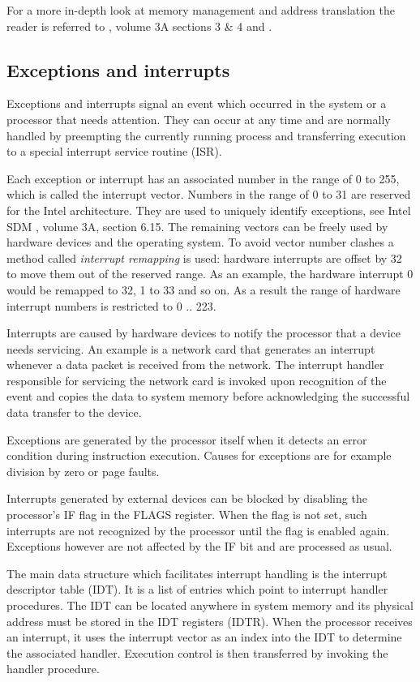 For a more in-depth look at memory management and address translation the reader
is referred to \cite{IntelSDM}, volume 3A sections 3 \& 4 and
\cite{Drepper07whatevery}.

\subsection{Exceptions and interrupts}\label{subsec:exceptions-interrupts}
Exceptions and interrupts signal an event which occurred in the system or a
processor that needs attention. They can occur at any time and are normally
handled by preempting the currently running process and transferring execution
to a special interrupt service routine (ISR).

Each exception or interrupt has an associated number in the range of 0 to 255,
which is called the interrupt vector. Numbers in the range of 0 to 31 are
reserved for the Intel architecture. They are used to uniquely identify
exceptions, see Intel SDM \cite{IntelSDM}, volume 3A, section 6.15.  The
remaining vectors can be freely used by hardware devices and the operating
system. To avoid vector number clashes a method called
\emph{interrupt remapping} is used: hardware interrupts are offset by 32 to move
them out of the reserved range. As an example, the hardware interrupt 0 would be
remapped to 32, 1 to 33 and so on. As a result the range of hardware interrupt
numbers is restricted to 0 .. 223.

Interrupts are caused by hardware devices to notify the processor that a device
needs servicing. An example is a network card that generates an interrupt
whenever a data packet is received from the network. The interrupt handler
responsible for servicing the network card is invoked upon recognition of the
event and copies the data to system memory before acknowledging the successful
data transfer to the device.

Exceptions are generated by the processor itself when it detects an error
condition during instruction execution. Causes for exceptions are for example
division by zero or page faults.

Interrupts generated by external devices can be blocked by disabling the
processor's IF flag in the FLAGS register. When the flag is not set, such
interrupts are not recognized by the processor until the flag is enabled again.
Exceptions however are not affected by the IF bit and are processed as usual.

The main data structure which facilitates interrupt handling is the interrupt
descriptor table (IDT). It is a list of entries which point to
interrupt handler procedures. The IDT can be located anywhere in system memory
and its physical address must be stored in the IDT registers (IDTR). When the
processor receives an interrupt, it uses the interrupt vector as an index into
the IDT to determine the associated handler. Execution control is then
transferred by invoking the handler procedure.

